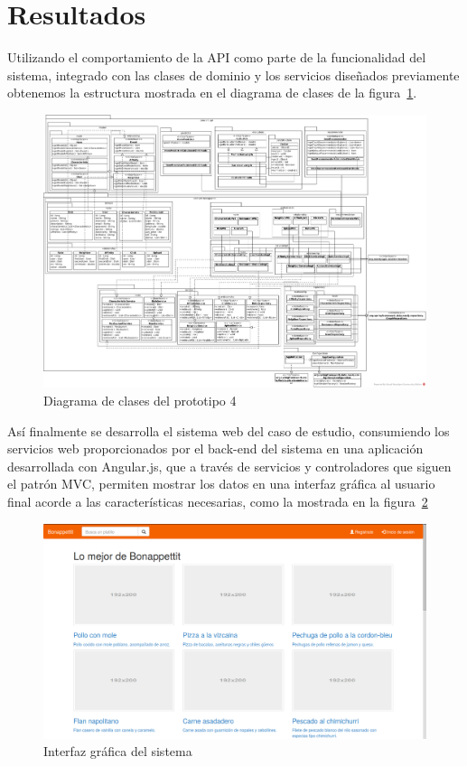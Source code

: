  \section{Resultados}
    Utilizando el comportamiento de la API como parte de la funcionalidad del sistema, integrado con las clases de dominio y los servicios diseñados previamente obtenemos la estructura mostrada en el diagrama de clases de la figura~\ref{fig:monster_classes}. 

    \begin{landscape}
      \begin{figure}[h!]
        \centering
        \includegraphics[width=25cm]{./images/monster_class}
        \caption{Diagrama de clases del prototipo 4}
        \label{fig:monster_classes}
      \end{figure}
    \end{landscape}

    Así finalmente se desarrolla el sistema web del caso de estudio, consumiendo los servicios web proporcionados por el back-end del sistema en una aplicación desarrollada con Angular.js, que a través de servicios y controladores que siguen el patrón MVC, permiten mostrar los datos en una interfaz gráfica al usuario final acorde a las características necesarias, como la mostrada en la figura~\ref{fig:final_bonappettit}


      \begin{figure}[h!]
        \centering
        \includegraphics[width=16cm]{./images/p4_bonappettit}
        \caption{Interfaz gráfica del sistema}
        \label{fig:final_bonappettit}
      \end{figure}

